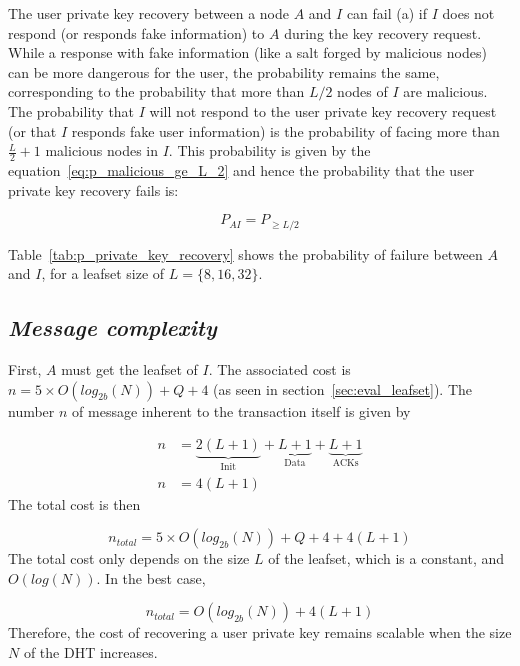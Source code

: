     The user private key recovery between a node $A$ and $I$ can fail (a) if $I$ does
not respond (or responds fake information) to $A$ during the key recovery
request. While a response with fake information (like a salt forged by malicious nodes) can be more dangerous for the
user, the probability remains the same, corresponding to the
probability that more than $L/2$ nodes of $I$ are malicious.\\
    The probability that $I$ will not respond to the user private key recovery
request (or that $I$ responds fake user information) is the probability of
facing more than $\frac{L}{2} +1$ malicious nodes in $I$. This probability is given by the
equation~\ref{eq:p_malicious_ge_L_2} and hence the probability that the user
private key recovery fails is:

\begin{equation} \label{eq:L_2_malicious_A_I}
 P_{AI} = P_{\ge L/2}
\end{equation}

    Table~\eqref{tab:p_private_key_recovery} shows the probability of failure
between $A$ and $I$, for a leafset size of $L = \{8,16,32\}$.

    
  \subsection{\textit{Message complexity}}
    First, $A$ must get the leafset of $I$. The associated cost is $n = 5
\times O(log_{2b}(N)) + Q + 4$ (as seen in section~\ref{sec:eval_leafset}).
    The number $n$ of message inherent to the transaction itself is given by

    \begin{align}
      n &= \underbrace{2(L+1)}_\text{Init} + \underbrace{L+1}_\text{Data} +  \underbrace{L+1}_\text{ACKs}\\
      n &= 4(L+1)
    \end{align}
     The total cost is then

    $$
      n_{total} = 5 \times O(log_{2b}(N)) + Q + 4 + 4(L+1)
    $$    
    The total cost only depends on the size $L$ of the leafset, which is a
constant, and $O(log(N))$. In the best case, 

    $$
      n_{total} = O(log_{2b}(N)) + 4(L+1)
    $$
    Therefore, the cost of recovering a user private key remains
scalable when the size $N$ of the DHT increases.


